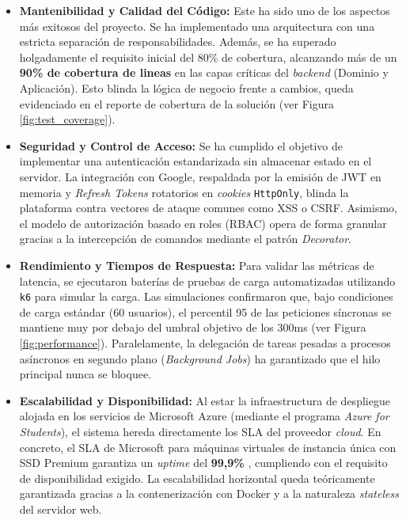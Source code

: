 \begin{itemize}
    \item \textbf{Mantenibilidad y Calidad del Código:} Este ha sido uno de los aspectos más exitosos del proyecto. Se ha implementado una arquitectura con una estricta separación de responsabilidades. Además, se ha superado holgadamente el requisito inicial del 80\% de cobertura, alcanzando más de un \textbf{90\% de cobertura de lineas} en las capas críticas del \emph{backend} (Dominio y Aplicación). Esto blinda la lógica de negocio frente a cambios, queda evidenciado en el reporte de cobertura de la solución (ver Figura \ref{fig:test_coverage}).
    
    \item \textbf{Seguridad y Control de Acceso:} Se ha cumplido el objetivo de implementar una autenticación estandarizada sin almacenar estado en el servidor. La integración con Google, respaldada por la emisión de \ac{JWT} en memoria y \emph{Refresh Tokens} rotatorios en \emph{cookies} \texttt{HttpOnly}, blinda la plataforma contra vectores de ataque comunes como \ac{XSS} o \ac{CSRF}. Asimismo, el modelo de autorización basado en roles (RBAC) opera de forma granular gracias a la intercepción de comandos mediante el patrón \emph{Decorator}.
    
    \item \textbf{Rendimiento y Tiempos de Respuesta:} Para validar las métricas de latencia, se ejecutaron baterías de pruebas de carga automatizadas utilizando \texttt{k6} para simular la carga. Las simulaciones confirmaron que, bajo condiciones de carga estándar (60 usuarios), el percentil 95 de las peticiones síncronas se mantiene muy por debajo del umbral objetivo de los 300ms (ver Figura \ref{fig:performance}). Paralelamente, la delegación de tareas pesadas a procesos asíncronos en segundo plano (\emph{Background Jobs}) ha garantizado que el hilo principal nunca se bloquee.
    
    \item \textbf{Escalabilidad y Disponibilidad:} Al estar la infraestructura de despliegue alojada en los servicios de Microsoft Azure (mediante el programa \emph{Azure for Students}), el sistema hereda directamente los \ac{SLA} del proveedor \emph{cloud}. En concreto, el \ac{SLA} de Microsoft para máquinas virtuales de instancia única con SSD Premium garantiza un \emph{uptime} del \textbf{99,9\%} \cite{azure_sla_vm}, cumpliendo con el requisito de disponibilidad exigido. La escalabilidad horizontal queda teóricamente garantizada gracias a la contenerización con Docker y a la naturaleza \emph{stateless} del servidor web.
    

\end{itemize}
